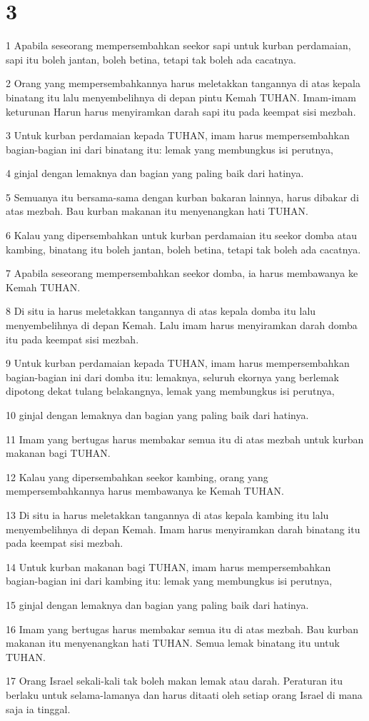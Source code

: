 \chapter{3}

\par 1 Apabila seseorang mempersembahkan seekor sapi untuk kurban perdamaian, sapi itu boleh jantan, boleh betina, tetapi tak boleh ada cacatnya.
\par 2 Orang yang mempersembahkannya harus meletakkan tangannya di atas kepala binatang itu lalu menyembelihnya di depan pintu Kemah TUHAN. Imam-imam keturunan Harun harus menyiramkan darah sapi itu pada keempat sisi mezbah.
\par 3 Untuk kurban perdamaian kepada TUHAN, imam harus mempersembahkan bagian-bagian ini dari binatang itu: lemak yang membungkus isi perutnya,
\par 4 ginjal dengan lemaknya dan bagian yang paling baik dari hatinya.
\par 5 Semuanya itu bersama-sama dengan kurban bakaran lainnya, harus dibakar di atas mezbah. Bau kurban makanan itu menyenangkan hati TUHAN.
\par 6 Kalau yang dipersembahkan untuk kurban perdamaian itu seekor domba atau kambing, binatang itu boleh jantan, boleh betina, tetapi tak boleh ada cacatnya.
\par 7 Apabila seseorang mempersembahkan seekor domba, ia harus membawanya ke Kemah TUHAN.
\par 8 Di situ ia harus meletakkan tangannya di atas kepala domba itu lalu menyembelihnya di depan Kemah. Lalu imam harus menyiramkan darah domba itu pada keempat sisi mezbah.
\par 9 Untuk kurban perdamaian kepada TUHAN, imam harus mempersembahkan bagian-bagian ini dari domba itu: lemaknya, seluruh ekornya yang berlemak dipotong dekat tulang belakangnya, lemak yang membungkus isi perutnya,
\par 10 ginjal dengan lemaknya dan bagian yang paling baik dari hatinya.
\par 11 Imam yang bertugas harus membakar semua itu di atas mezbah untuk kurban makanan bagi TUHAN.
\par 12 Kalau yang dipersembahkan seekor kambing, orang yang mempersembahkannya harus membawanya ke Kemah TUHAN.
\par 13 Di situ ia harus meletakkan tangannya di atas kepala kambing itu lalu menyembelihnya di depan Kemah. Imam harus menyiramkan darah binatang itu pada keempat sisi mezbah.
\par 14 Untuk kurban makanan bagi TUHAN, imam harus mempersembahkan bagian-bagian ini dari kambing itu: lemak yang membungkus isi perutnya,
\par 15 ginjal dengan lemaknya dan bagian yang paling baik dari hatinya.
\par 16 Imam yang bertugas harus membakar semua itu di atas mezbah. Bau kurban makanan itu menyenangkan hati TUHAN. Semua lemak binatang itu untuk TUHAN.
\par 17 Orang Israel sekali-kali tak boleh makan lemak atau darah. Peraturan itu berlaku untuk selama-lamanya dan harus ditaati oleh setiap orang Israel di mana saja ia tinggal.

